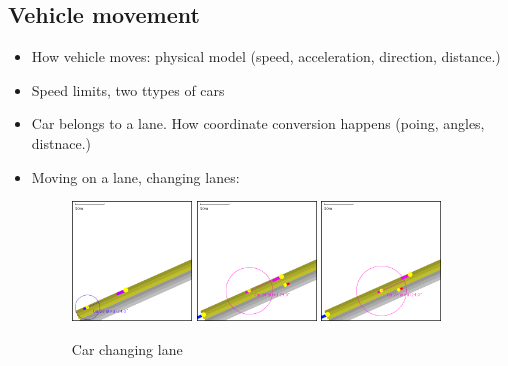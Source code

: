 \subsection{Vehicle movement}
\begin{itemize}
    \item How vehicle moves: physical model (speed, acceleration, direction, distance.)
    \item Speed limits, two ttypes of cars
    \item Car belongs to a lane. How coordinate conversion happens (poing, angles, distnace.)
    \item Moving on a lane, changing lanes:
        \begin{figure}[h]
            \caption{Car changing lane}
            \label{fig:carKeepingDistance}
            \centering
            \includegraphics[width=0.3\textwidth]{figs/carMovement/car_keeping_distance_to_other.png}
            \hspace{0.2em}
            \includegraphics[width=0.3\textwidth]{figs/carMovement/car_lane_change_before.png}
            \hspace{0.2em}
            \includegraphics[width=0.3\textwidth]{figs/carMovement/car_lane_change_after.png}
        \end{figure}


\end{itemize}
